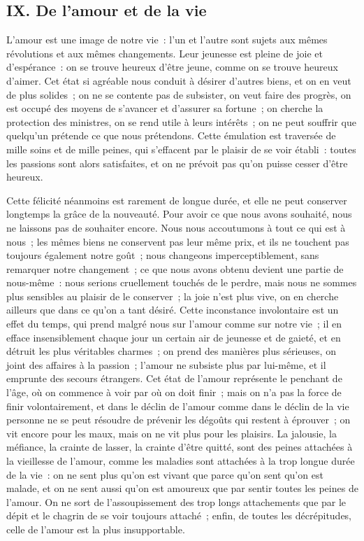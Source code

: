 \documentclass[french,twoside]{book} %
\begin{document}
\subsection[{IX. De l’amour et de la vie}]{IX. De l’amour et de la vie}
\noindent L’amour est une image de notre vie : l’un et l’autre sont sujets aux mêmes révolutions et aux mêmes changements. Leur jeunesse est pleine de joie et d’espérance : on se trouve heureux d’être jeune, comme on se trouve heureux d’aimer. Cet état si agréable nous conduit à désirer d’autres biens, et on en veut de plus solides ; on ne se contente pas de subsister, on veut faire des progrès, on est occupé des moyens de s’avancer et d’assurer sa fortune ; on cherche la protection des ministres, on se rend utile à leurs intérêts ; on ne peut souffrir que quelqu’un prétende ce que nous prétendons. Cette émulation est traversée de mille soins et de mille peines, qui s’effacent par le plaisir de se voir établi : toutes les passions sont alors satisfaites, et on ne prévoit pas qu’on puisse cesser d’être heureux.\par
Cette félicité néanmoins est rarement de longue durée, et elle ne peut conserver longtemps la grâce de la nouveauté. Pour avoir ce que nous avons souhaité, nous ne laissons pas de souhaiter encore. Nous nous accoutumons à tout ce qui est à nous ; les mêmes biens ne conservent pas leur même prix, et ils ne touchent pas toujours également notre goût ; nous changeons imperceptiblement, sans remarquer notre changement ; ce que nous avons obtenu devient une partie de nous-même : nous serions cruellement touchés de le perdre, mais nous ne sommes plus sensibles au plaisir de le conserver ; la joie n’est plus vive, on en cherche ailleurs que dans ce qu’on a tant désiré. Cette inconstance involontaire est un effet du temps, qui prend malgré nous sur l’amour comme sur notre vie ; il en efface insensiblement chaque jour un certain air de jeunesse et de gaieté, et en détruit les plus véritables charmes ; on prend des manières plus sérieuses, on joint des affaires à la passion ; l’amour ne subsiste plus par lui-même, et il emprunte des secours étrangers. Cet état de l’amour représente le penchant de l’âge, où on commence à voir par où on doit finir ; mais on n’a pas la force de finir volontairement, et dans le déclin de l’amour comme dans le déclin de la vie personne ne se peut résoudre de prévenir les dégoûts qui restent à éprouver ; on vit encore pour les maux, mais on ne vit plus pour les plaisirs. La jalousie, la méfiance, la crainte de lasser, la crainte d’être quitté, sont des peines attachées à la vieillesse de l’amour, comme les maladies sont attachées à la trop longue durée de la vie : on ne sent plus qu’on est vivant que parce qu’on sent qu’on est malade, et on ne sent aussi qu’on est amoureux que par sentir toutes les peines de l’amour. On ne sort de l’assoupissement des trop longs attachements que par le dépit et le chagrin de se voir toujours attaché ; enfin, de toutes les décrépitudes, celle de l’amour est la plus insupportable.
\end{document}
